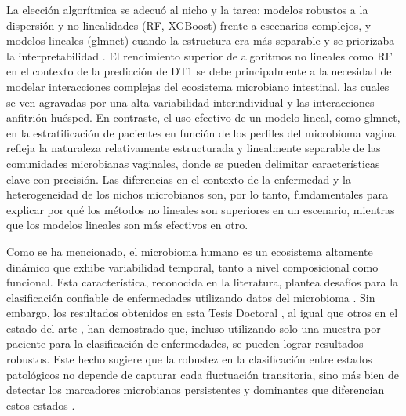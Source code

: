 La elección algorítmica se adecuó al nicho y la tarea: modelos robustos a la dispersión y no linealidades (RF, XGBoost) frente a escenarios complejos, y modelos lineales (glmnet) cuando la estructura era más separable y se priorizaba la interpretabilidad \cite{goodswen2021machine, Lin2023MicrobiomeObesitySignatures}. El rendimiento superior de algoritmos no lineales como RF en el contexto de la predicción de DT1 \cite{paper2} se debe principalmente a la necesidad de modelar interacciones complejas del ecosistema microbiano intestinal, las cuales se ven agravadas por una alta variabilidad interindividual y las interacciones anfitrión-huésped. En contraste, el uso efectivo de un modelo lineal, como glmnet, en la estratificación de pacientes en función de los perfiles del microbioma vaginal \cite{paper3} refleja la naturaleza relativamente estructurada y linealmente separable de las comunidades microbianas vaginales, donde se pueden delimitar características clave con precisión. Las diferencias en el contexto de la enfermedad y la heterogeneidad de los nichos microbianos son, por lo tanto, fundamentales para explicar por qué los métodos no lineales son superiores en un escenario, mientras que los modelos lineales son más efectivos en otro.


Como se ha mencionado, el microbioma humano es un ecosistema altamente dinámico que exhibe variabilidad temporal, tanto a nivel composicional como funcional. Esta característica, reconocida en la literatura, plantea desafíos para la clasificación confiable de enfermedades utilizando datos del microbioma \cite{aldars2021systematic}. Sin embargo, los resultados obtenidos en esta Tesis Doctoral \cite{paper2, paper3}, al igual que otros en el estado del arte \cite{eck2017robust}, han demostrado que, incluso utilizando solo una muestra por paciente para la clasificación de enfermedades, se pueden lograr resultados robustos. Este hecho sugiere que la robustez en la clasificación entre estados patológicos no depende de capturar cada fluctuación transitoria, sino más bien de detectar los marcadores microbianos persistentes y dominantes que diferencian estos estados \cite{mehta2018stability}.


